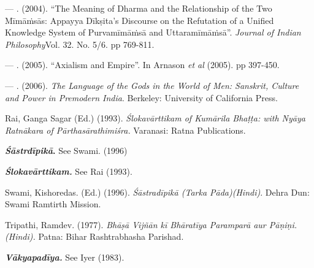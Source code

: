 \begin{thebibliography}{99}
  — . (2004). “The Meaning of Dharma and the Relationship of the Two Mīmāṁsās: Appayya Dīkṣita’s Discourse on the Refutation of a Unified Knowledge System of Purvamīmāṁsā and Uttaramīmāṁsā”. \textit{Journal of Indian Philosophy}Vol. 32. No. 5/6. pp 769-811. 

  — . (2005). “Axialism and Empire”. In Arnason \textit{et al} (2005). pp 397-450.

  — . (2006). \textit{The Language of the Gods in the World of Men: Sanskrit, Culture and Power in Premodern India}. Berkeley: University of California Press.

  Rai, Ganga Sagar (Ed.) (1993). \textit{Ślokavārttikam of Kumārila Bhaṭṭa: with Nyāya Ratnākara of Pārthasārathimiśra.} Varanasi: Ratna Publications.

  \textbf{\textit{Śāstrdīpikā}.} See Swami. (1996)

  \textbf{\textit{Ślokavārttikam.}} See Rai (1993).

  Swami, Kishoredas. (Ed.) (1996). \textit{Śāstradīpikā (Tarka Pāda)(Hindi)}. Dehra Dun: Swami Ramtirth Mission.

  Tripathi, Ramdev. (1977). \textit{Bhāṣā Vijñān kī Bhāratīya Paramparā aur Pāṇiṇi. (Hindi).} Patna: Bihar Rashtrabhasha Parishad.

  \textbf{\textit{Vākyapadīya.}} See Iyer (1983).
 
 \end{thebibliography}

